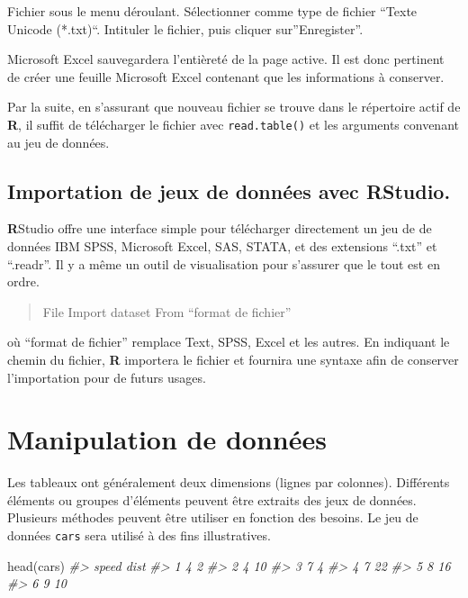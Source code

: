 \documentclass[
]{book}
\newenvironment{Shaded}{}{}
\newcommand{\CommentTok}[1]{\textit{#1}}
\newcommand{\FunctionTok}[1]{#1}
\newcommand{\NormalTok}[1]{#1}
\begin{document}
Fichier sous le menu déroulant. Sélectionner comme type de fichier ``Texte Unicode (*.txt)``. Intituler le fichier, puis cliquer sur''Enregister''.

Microsoft Excel sauvegardera l'entièreté de la page active. Il est donc pertinent de créer une feuille Microsoft Excel contenant que les informations à conserver.

Par la suite, en s'assurant que nouveau fichier se trouve dans le répertoire actif de \textbf{R}, il suffit de télécharger le fichier avec \texttt{read.table()} et les arguments convenant au jeu de données.

\hypertarget{importation-de-jeux-de-donnuxe9es-avec-rstudio.}{%
\subsection{\texorpdfstring{Importation de jeux de données avec \textbf{R}Studio.}{Importation de jeux de données avec RStudio.}}\label{importation-de-jeux-de-donnuxe9es-avec-rstudio.}}

\textbf{R}Studio offre une interface simple pour télécharger directement un jeu de de données IBM SPSS, Microsoft Excel, SAS, STATA, et des extensions ``.txt'' et ``.readr''. Il y a même un outil de visualisation pour s'assurer que le tout est en ordre.

\begin{quote}
File
Import dataset
From ``format de fichier''
\end{quote}

où ``format de fichier'' remplace Text, SPSS, Excel et les autres. En indiquant le chemin du fichier, \textbf{R} importera le fichier et fournira une syntaxe afin de conserver l'importation pour de futurs usages.

\hypertarget{manipulation-de-donnuxe9es}{%
\section{Manipulation de données}\label{manipulation-de-donnuxe9es}}

Les tableaux ont généralement deux dimensions (lignes par colonnes). Différents éléments ou groupes d'éléments peuvent être extraits des jeux de données. Plusieurs méthodes peuvent être utiliser en fonction des besoins. Le jeu de données \texttt{cars} sera utilisé à des fins illustratives.

\begin{Shaded}
\begin{Highlighting}[]
\FunctionTok{head}\NormalTok{(cars)}
\CommentTok{\#\textgreater{}   speed dist}
\CommentTok{\#\textgreater{} 1     4    2}
\CommentTok{\#\textgreater{} 2     4   10}
\CommentTok{\#\textgreater{} 3     7    4}
\CommentTok{\#\textgreater{} 4     7   22}
\CommentTok{\#\textgreater{} 5     8   16}
\CommentTok{\#\textgreater{} 6     9   10}
\end{Highlighting}
\end{Shaded}
\end{document}
